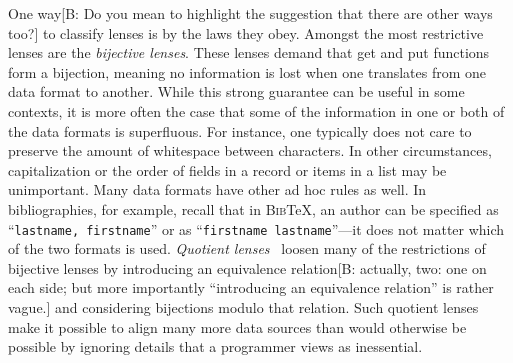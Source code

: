 \documentclass[acmsmall,review,anonymous]{acmart}
\newcommand{\FINISH}[3]{\ifdraft\textcolor{#1}{[#2: #3]}\fi}
\newcommand{\bcp}[1]{\FINISH{dkred}{B}{#1}}
\newcommand{\bibtex}{\textsc{Bib}\TeX{}}
\newcommand{\cd}[1]{\lstinline[backgroundcolor=\color{white}]$#1$}
\begin{document}
One way\bcp{Do you mean to highlight the suggestion that there are other
  ways too?} to classify lenses is by the laws they obey.  Amongst the most
restrictive lenses are the \emph{bijective lenses}.  These lenses demand
that get and put functions form a bijection, meaning no information
is lost when one translates from one data format to another.  While this
strong guarantee can be useful in some contexts, it is more often the case
that some of the information in one or both of the data formats is superfluous.
For instance, one typically does not care to preserve the amount of
whitespace between characters.  In other circumstances, capitalization
or the order of fields in a record or items in a list may be unimportant.
%
Many data formats have other ad hoc rules as well.
In bibliographies, for example, recall that in \bibtex{},
an author can be specified as
``\cd{lastname, firstname}'' or as ``\cd{firstname lastname}''---it does not matter which of the
two formats is used.
%
{\em Quotient lenses}~\cite{quotientlenses} loosen many of the restrictions
of bijective lenses by introducing an equivalence relation\bcp{actually,
  two: one on each side; but more importantly ``introducing an equivalence
  relation'' is rather vague.} and considering
bijections modulo that relation.  Such quotient lenses make it possible
to align many more data sources than would otherwise be possible by
ignoring details that a programmer views as inessential.
\end{document}
